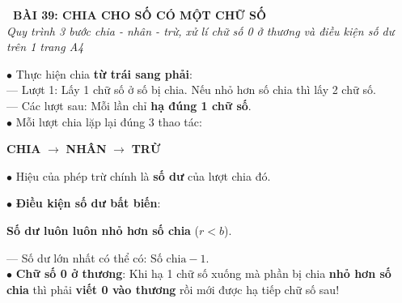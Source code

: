 \documentclass[14pt,a4paper,oneside]{extbook}
\begin{document}
\noindent
\begin{tcolorbox}[
  enhanced,
  colback=teal!8!white,
  colframe=teal!80!black,
  arc=3mm, boxrule=1pt,
  left=3mm, right=3mm, top=2mm, bottom=2mm,
  halign=center
]
  {\Large\bfseries\color{teal!90!black}\faBookmark\ BÀI 39: CHIA CHO SỐ CÓ MỘT CHỮ SỐ}\\[1.5pt]
  {\footnotesize\itshape\color{black!75} Quy trình 3 bước chia - nhân - trừ, xử lí chữ số 0 ở thương và điều kiện số dư trên 1 trang A4}
\end{tcolorbox}

\vspace{2mm}

\noindent
\begin{minipage}[t]{0.49\textwidth}
  \begin{tcolorbox}[
    enhanced,
    title={\footnotesize\bfseries\color{white}\faSortNumericAsc\ 1. Quy trình chia 3 thao tác},
    colback=blue!2!white,
    colframe=blue!75!black,
    arc=2.5mm, boxrule=0.8pt, top=1.8mm, bottom=1.8mm, left=2mm, right=2mm
  ]
    \footnotesize
    $\bullet$ Thực hiện chia \textbf{từ trái sang phải}:\\
    --- Lượt 1: Lấy 1 chữ số ở số bị chia. Nếu nhỏ hơn số chia thì lấy 2 chữ số.\\
    --- Các lượt sau: Mỗi lần chỉ \textbf{hạ đúng 1 chữ số}.\\
    $\bullet$ Mỗi lượt chia lặp lại đúng 3 thao tác:
    \begin{center}
      \textbf{CHIA} $\rightarrow$ \textbf{NHÂN} $\rightarrow$ \textbf{TRỪ}
    \end{center}
    $\bullet$ Hiệu của phép trừ chính là \textbf{số dư} của lượt chia đó.
  \end{tcolorbox}
\end{minipage}%
\hfill
\begin{minipage}[t]{0.49\textwidth}
  \begin{tcolorbox}[
    enhanced,
    title={\footnotesize\bfseries\color{white}\faShield\ 2. Số dư \& Chữ số 0 ở thương},
    colback=teal!2!white,
    colframe=teal!75!black,
    arc=2.5mm, boxrule=0.8pt, top=1.8mm, bottom=1.8mm, left=2mm, right=2mm
  ]
    \footnotesize
    $\bullet$ \textbf{Điều kiện số dư bất biến}:\\
    \begin{center}
      \textbf{Số dư luôn luôn nhỏ hơn số chia} ($r < b$).
    \end{center}
    --- Số dư lớn nhất có thể có: $\text{Số chia} - 1$.\\
    $\bullet$ \textbf{Chữ số 0 ở thương}: Khi hạ 1 chữ số xuống mà phần bị chia \textbf{nhỏ hơn số chia} thì phải \textbf{viết 0 vào thương} rồi mới được hạ tiếp chữ số sau!
  \end{tcolorbox}
\end{minipage}
\end{document}
